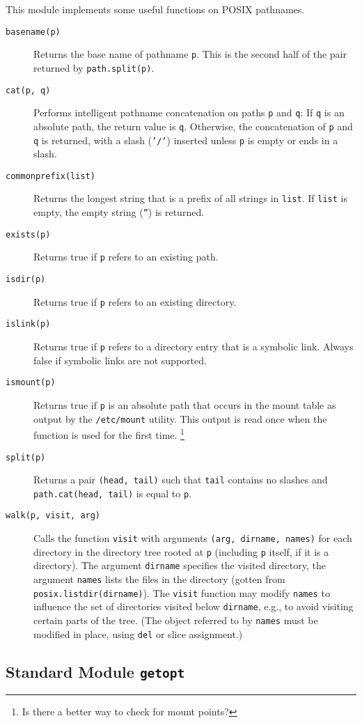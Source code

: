 This module implements some useful functions on POSIX pathnames.
\begin{description}
\item[{\tt basename(p)}]
Returns the base name of pathname
{\tt p}.
This is the second half of the pair returned by
{\tt path.split(p)}.
\item[{\tt cat(p, q)}]
Performs intelligent pathname concatenation on paths
{\tt p}
and
{\tt q}:
If
{\tt q}
is an absolute path, the return value is
{\tt q}.
Otherwise, the concatenation of
{\tt p}
and
{\tt q}
is returned, with a slash ({\tt '/'}) inserted unless
{\tt p}
is empty or ends in a slash.
\item[{\tt commonprefix(list)}]
Returns the longest string that is a prefix of all strings in
{\tt list}.
If
{\tt list}
is empty, the empty string ({\tt ''}) is returned.
\item[{\tt exists(p)}]
Returns true if
{\tt p}
refers to an existing path.
\item[{\tt isdir(p)}]
Returns true if
{\tt p}
refers to an existing directory.
\item[{\tt islink(p)}]
Returns true if
{\tt p}
refers to a directory entry that is a symbolic link.
Always false if symbolic links are not supported.
\item[{\tt ismount(p)}]
Returns true if
{\tt p}
is an absolute path that occurs in the mount table as output by the
{\tt /etc/mount}
utility.
This output is read once when the function is used for the first
time.%
\footnote{
Is there a better way to check for mount points?
}
\item[{\tt split(p)}]
Returns a pair
{\tt (head,~tail)}
such that
{\tt tail}
contains no slashes and
{\tt path.cat(head, tail)}
is equal to
{\tt p}.
\item[{\tt walk(p, visit, arg)}]
Calls the function
{\tt visit}
with arguments
{\tt (arg, dirname, names)}
for each directory in the directory tree rooted at
{\tt p}
(including
{\tt p}
itself, if it is a directory).
The argument
{\tt dirname}
specifies the visited directory, the argument
{\tt names}
lists the files in the directory (gotten from
{\tt posix.listdir(dirname)}).
The
{\tt visit}
function may modify
{\tt names}
to influence the set of directories visited below
{\tt dirname},
e.g.,
to avoid visiting certain parts of the tree.
(The object referred to by
{\tt names}
must be modified in place, using
{\tt del}
or slice assignment.)
\end{description}

\subsection{Standard Module {\tt getopt}}

